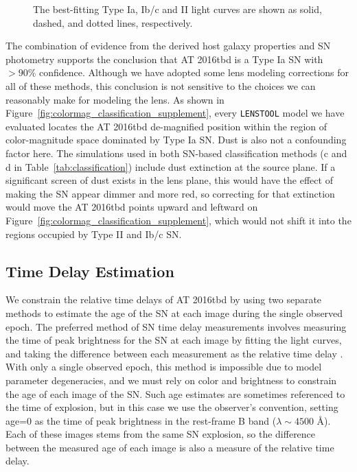 \documentclass[12pt]{article}
\def\SNABC{AT 2016tbd\xspace}
\def\lenstool{{\tt LENSTOOL}\xspace}
\begin{document}
\begin{figure}
{{    %
    }{The best-fitting Type Ia, Ib/c and II light curves are shown as solid, dashed, and dotted lines, respectively.}
    \label{fig:classification_lightcurves}
    }
\end{figure}

The combination of evidence from the derived host galaxy properties  and SN photometry supports the conclusion that \SNABC  is  a Type Ia SN with $>90\%$ confidence.  Although we have adopted some lens modeling corrections for all of these methods, this conclusion is not sensitive to the choices we can reasonably make for modeling the lens.  As shown in Figure~\ref{fig:colormag_classification_supplement}, every  \lenstool model we have evaluated locates the \SNABC  de-magnified position within the region of color-magnitude space dominated by Type Ia SN. Dust is also not a confounding factor here. 
The simulations used in both SN-based classification methods (c and d in Table~\ref{tab:classification}) include dust extinction at the source plane.  If a significant screen of dust exists in the lens plane, this would have the effect of making the SN appear dimmer and more red, so correcting for that extinction would move the \SNABC points upward and leftward on Figure~\ref{fig:colormag_classification_supplement}, which would not shift it into the regions occupied by Type II and Ib/c SN. 


\subsection*{Time Delay Estimation}

We constrain the relative time delays of \SNABC by using two separate methods to estimate the age of the SN at each image during the single observed epoch. The preferred method of SN time delay measurements involves measuring the time of peak brightness for the SN at each image by fitting the light curves, and taking the difference between each measurement as the relative time delay \cite{pierel_turning_2019,dhawan_magnification_2019,huber_strongly_2019}. With only a single observed epoch, this method is impossible due to model parameter degeneracies, and we must rely on color and brightness to constrain the age of each image of the SN. Such age estimates are sometimes referenced to the time of explosion, but in this case we use the observer's convention, setting age=0 as the time of peak brightness in the rest-frame B band ($\lambda\sim4500$ \AA).  Each of these images stems from the same SN explosion, so the difference between the measured age of each image is also a measure of the relative time delay. 
\end{document}
